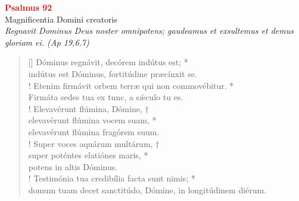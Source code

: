 


\def\greinitialformat#1{%
{\fontsize{39}{39}\selectfont #1}%
}




\vspace{0.3cm}
\begin{center}
 \textcolor{red}{\large \bf Psalmus 92}\\
Magnificentia Domini creatoris\\
\textit{\small Regnavit Dominus Deus noster omnipotens; gaudeamus et exsultemus et demus gloriam ei. (Ap 19,6.7)}
\end{center}
\begin{verse}[\versewidth]
Dóminus regnávit, decórem indútus est; *\\
indútus est Dóminus, fortitúdine præcínxit se.\\!
\vin Etenim firmávit orbem terræ qui non commovébitur. *\\
\vin Firmáta sedes tua ex tunc, a s\'{æ}culo tu es.\\!
Elevavérunt flúmina, Dómine, †\\
elevavérunt flúmina vocem suam, *\\
elevavérunt flúmina fragórem suum.\\!
\vin Super voces aquárum multárum, †\\
\vin super poténtes elatiónes maris, *\\
\vin potens in altis Dóminus.\\!
Testimónia tua credibília facta sunt nimis; *\\
domum tuam decet sanctitúdo, Dómine, in longitúdinem diérum.\\
\end{verse}
\vspace{1cm}



